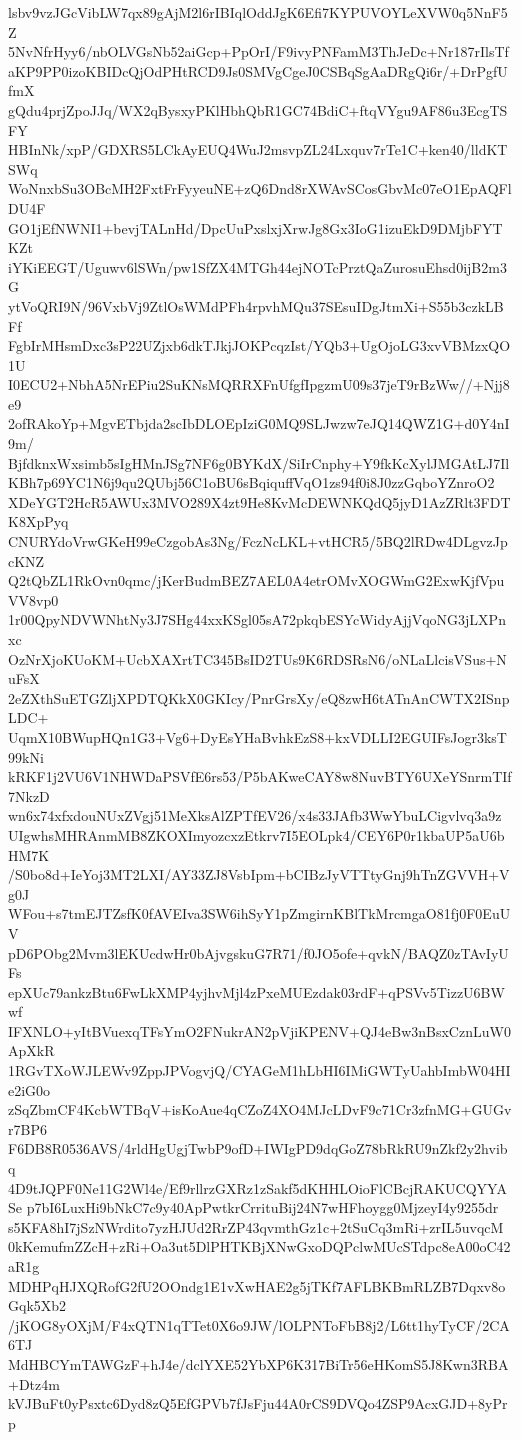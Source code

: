 lsbv9vzJGcVibLW7qx89gAjM2l6rIBIqlOddJgK6Efi7KYPUVOYLeXVW0q5NnF5Z
5NvNfrHyy6/nbOLVGsNb52aiGcp+PpOrI/F9ivyPNFamM3ThJeDc+Nr187rIlsTf
aKP9PP0izoKBIDcQjOdPHtRCD9Js0SMVgCgeJ0CSBqSgAaDRgQi6r/+DrPgfUfmX
gQdu4prjZpoJJq/WX2qBysxyPKlHbhQbR1GC74BdiC+ftqVYgu9AF86u3EcgTSFY
HBInNk/xpP/GDXRS5LCkAyEUQ4WuJ2msvpZL24Lxquv7rTe1C+ken40/lldKTSWq
WoNnxbSu3OBcMH2FxtFrFyyeuNE+zQ6Dnd8rXWAvSCosGbvMc07eO1EpAQFlDU4F
GO1jEfNWNI1+bevjTALnHd/DpcUuPxslxjXrwJg8Gx3IoG1izuEkD9DMjbFYTKZt
iYKiEEGT/Uguwv6lSWn/pw1SfZX4MTGh44ejNOTcPrztQaZurosuEhsd0ijB2m3G
ytVoQRI9N/96VxbVj9ZtlOsWMdPFh4rpvhMQu37SEsuIDgJtmXi+S55b3czkLBFf
FgbIrMHsmDxc3sP22UZjxb6dkTJkjJOKPcqzIst/YQb3+UgOjoLG3xvVBMzxQO1U
I0ECU2+NbhA5NrEPiu2SuKNsMQRRXFnUfgfIpgzmU09s37jeT9rBzWw//+Njj8e9
2ofRAkoYp+MgvETbjda2scIbDLOEpIziG0MQ9SLJwzw7eJQ14QWZ1G+d0Y4nI9m/
BjfdknxWxsimb5sIgHMnJSg7NF6g0BYKdX/SiIrCnphy+Y9fkKcXylJMGAtLJ7Il
KBh7p69YC1N6j9qu2QUbj56C1oBU6sBqiquffVqO1zs94f0i8J0zzGqboYZnroO2
XDeYGT2HcR5AWUx3MVO289X4zt9He8KvMcDEWNKQdQ5jyD1AzZRlt3FDTK8XpPyq
CNURYdoVrwGKeH99eCzgobAs3Ng/FczNcLKL+vtHCR5/5BQ2lRDw4DLgvzJpcKNZ
Q2tQbZL1RkOvn0qmc/jKerBudmBEZ7AEL0A4etrOMvXOGWmG2ExwKjfVpuVV8vp0
1r00QpyNDVWNhtNy3J7SHg44xxKSgl05sA72pkqbESYcWidyAjjVqoNG3jLXPnxc
OzNrXjoKUoKM+UcbXAXrtTC345BsID2TUs9K6RDSRsN6/oNLaLlcisVSus+NuFsX
2eZXthSuETGZljXPDTQKkX0GKIcy/PnrGrsXy/eQ8zwH6tATnAnCWTX2ISnpLDC+
UqmX10BWupHQn1G3+Vg6+DyEsYHaBvhkEzS8+kxVDLLI2EGUIFsJogr3ksT99kNi
kRKF1j2VU6V1NHWDaPSVfE6rs53/P5bAKweCAY8w8NuvBTY6UXeYSnrmTIf7NkzD
wn6x74xfxdouNUxZVgj51MeXksAlZPTfEV26/x4s33JAfb3WwYbuLCigvlvq3a9z
UIgwhsMHRAnmMB8ZKOXImyozcxzEtkrv7I5EOLpk4/CEY6P0r1kbaUP5aU6bHM7K
/S0bo8d+IeYoj3MT2LXI/AY33ZJ8VsbIpm+bCIBzJyVTTtyGnj9hTnZGVVH+Vg0J
WFou+s7tmEJTZsfK0fAVEIva3SW6ihSyY1pZmgirnKBlTkMrcmgaO81fj0F0EuUV
pD6PObg2Mvm3lEKUcdwHr0bAjvgskuG7R71/f0JO5ofe+qvkN/BAQZ0zTAvIyUFs
epXUc79ankzBtu6FwLkXMP4yjhvMjl4zPxeMUEzdak03rdF+qPSVv5TizzU6BWwf
IFXNLO+yItBVuexqTFsYmO2FNukrAN2pVjiKPENV+QJ4eBw3nBsxCznLuW0ApXkR
1RGvTXoWJLEWv9ZppJPVogvjQ/CYAGeM1hLbHI6IMiGWTyUahbImbW04HIe2iG0o
zSqZbmCF4KcbWTBqV+isKoAue4qCZoZ4XO4MJcLDvF9c71Cr3zfnMG+GUGvr7BP6
F6DB8R0536AVS/4rldHgUgjTwbP9ofD+IWIgPD9dqGoZ78bRkRU9nZkf2y2hvibq
4D9tJQPF0Ne11G2Wl4e/Ef9rllrzGXRz1zSakf5dKHHLOioFlCBcjRAKUCQYYASe
p7bI6LuxHi9bNkC7c9y40ApPwtkrCrrituBij24N7wHFhoygg0MjzeyI4y9255dr
s5KFA8hI7jSzNWrdito7yzHJUd2RrZP43qvmthGz1c+2tSuCq3mRi+zrIL5uvqcM
0kKemufmZZcH+zRi+Oa3ut5DlPHTKBjXNwGxoDQPclwMUcSTdpc8eA00oC42aR1g
MDHPqHJXQRofG2fU2OOndg1E1vXwHAE2g5jTKf7AFLBKBmRLZB7Dqxv8oGqk5Xb2
/jKOG8yOXjM/F4xQTN1qTTet0X6o9JW/lOLPNToFbB8j2/L6tt1hyTyCF/2CA6TJ
MdHBCYmTAWGzF+hJ4e/dclYXE52YbXP6K317BiTr56eHKomS5J8Kwn3RBA+Dtz4m
kVJBuFt0yPsxtc6Dyd8zQ5EfGPVb7fJsFju44A0rCS9DVQo4ZSP9AcxGJD+8yPrp
